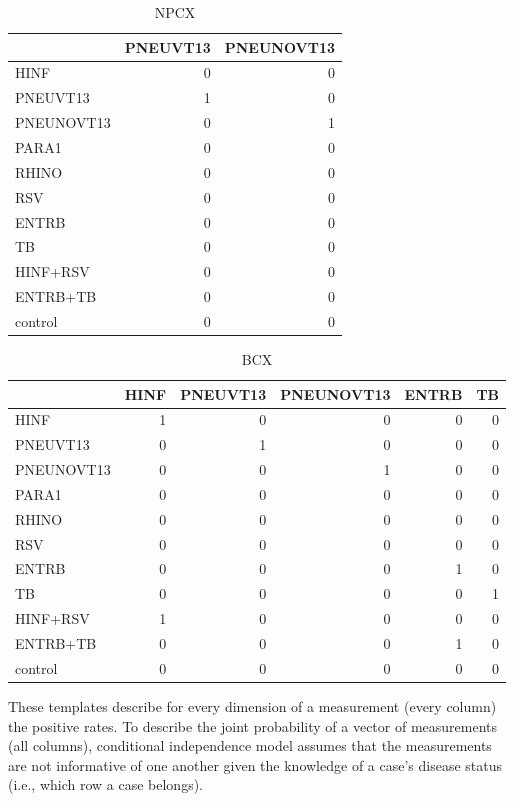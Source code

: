 \documentclass[article]{jss}
\begin{document}
\begin{CodeChunk}
\begin{table}
\caption{NPCX}
\begin{tabular}{l|r|r}
\hline
  & PNEUVT13 & PNEUNOVT13\\
\hline
HINF & 0 & 0\\
\hline
PNEUVT13 & 1 & 0\\
\hline
PNEUNOVT13 & 0 & 1\\
\hline
PARA1 & 0 & 0\\
\hline
RHINO & 0 & 0\\
\hline
RSV & 0 & 0\\
\hline
ENTRB & 0 & 0\\
\hline
TB & 0 & 0\\
\hline
HINF+RSV & 0 & 0\\
\hline
ENTRB+TB & 0 & 0\\
\hline
control & 0 & 0\\
\hline
\end{tabular}
\end{table}

\begin{table}

\caption{BCX}
\begin{tabular}{l|r|r|r|r|r}
\hline
  & HINF & PNEUVT13 & PNEUNOVT13 & ENTRB & TB\\
\hline
HINF & 1 & 0 & 0 & 0 & 0\\
\hline
PNEUVT13 & 0 & 1 & 0 & 0 & 0\\
\hline
PNEUNOVT13 & 0 & 0 & 1 & 0 & 0\\
\hline
PARA1 & 0 & 0 & 0 & 0 & 0\\
\hline
RHINO & 0 & 0 & 0 & 0 & 0\\
\hline
RSV & 0 & 0 & 0 & 0 & 0\\
\hline
ENTRB & 0 & 0 & 0 & 1 & 0\\
\hline
TB & 0 & 0 & 0 & 0 & 1\\
\hline
HINF+RSV & 1 & 0 & 0 & 0 & 0\\
\hline
ENTRB+TB & 0 & 0 & 0 & 1 & 0\\
\hline
control & 0 & 0 & 0 & 0 & 0\\
\hline
\end{tabular}
\end{table}

\end{CodeChunk}

These templates describe for every dimension of a measurement (every
column) the positive rates. To describe the joint probability of a
vector of measurements (all columns), conditional independence model
assumes that the measurements are not informative of one another given
the knowledge of a case's disease status (i.e., which row a case
belongs).
\end{document}
